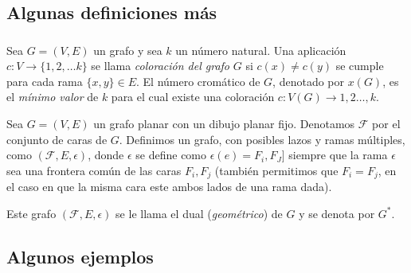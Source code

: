 \documentclass[spanish,utf8]{beamer}
\theoremstyle{definition}
\begin{document}
\subsection{Algunas definiciones más}

\begin{frame}[allowframebreaks]
\frametitle{\insertsubsection}

\begin{definition} 
Sea $G=(V,E)$ un grafo y sea $k$ un número natural. Una aplicación $c:V\to \{1,2,\ldots k\}$ se llama \emph{coloración del grafo} $G$ si $c(x)\neq c(y)$ se cumple para cada rama $\{x,y\}\in E$. \linebreak El número cromático de $G$, denotado por $x(G)$, es el \emph{mínimo valor} de $k$ para el cual existe una coloración $c:V(G)\to {1,2\ldots,k}$.
\end{definition}

\begin{definition}
Sea $G=(V,E)$ un grafo planar con un dibujo planar fijo. Denotamos $\mathcal{F}$ por el conjunto de caras de $G$. Definimos un grafo, con posibles lazos y ramas múltiples, como $(\mathcal{F},E,\epsilon)$, donde $\epsilon$ se define como $\epsilon(e)={F_i,F_J]}$ siempre que la rama $\epsilon$ sea una frontera común de las caras $F_i,F_j$ (también permitimos que $F_i=F_j$, en el caso en que la misma cara este ambos lados de una rama dada).

Este grafo $(\mathcal{F},E,\epsilon)$ se le llama el dual (\emph{geométrico}) de $G$ y se denota por $G^*$.	
\end{definition}
\end{frame}

\subsection{Algunos ejemplos}
\end{document}
